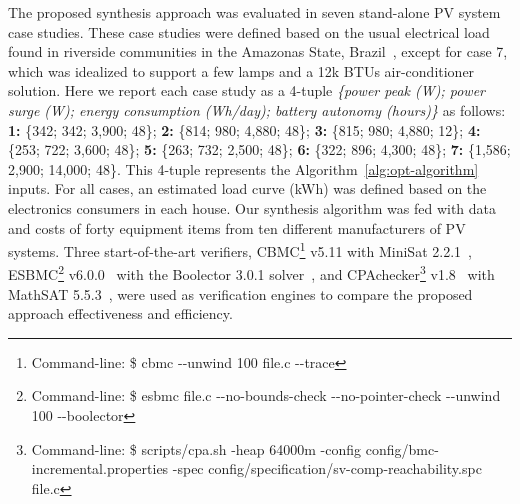 \documentclass[runningheads]{llncs}
\begin{document}
The proposed synthesis approach was evaluated in seven stand-alone PV system case studies.
These case studies were defined based on the usual electrical load found in riverside communities in the Amazonas State, Brazil~\cite{TrindadeCordeiro19,Agrener2013}, except for case 7, which was idealized to support a few lamps and a 12k BTUs air-conditioner solution. 
Here we report each case study as a 4-tuple \textit{\{power peak (W); power surge (W); energy consumption (Wh/day); battery autonomy (hours)\}} as follows:
\textbf{1:} \{342; 342; 3,900; 48\}; \textbf{2:} \{814; 980; 4,880; 48\}; \textbf{3:} \{815; 980; 4,880; 12\}; \textbf{4:} \{253; 722; 3,600; 48\}; \textbf{5:} \{263; 732; 2,500; 48\}; \textbf{6:} \{322; 896; 4,300; 48\}; \textbf{7:} \{1,586; 2,900; 14,000; 48\}. This 4-tuple represents the Algorithm~\ref{alg:opt-algorithm} inputs. For all cases, an estimated load curve (kWh) was defined based on the electronics consumers in each house. Our synthesis algorithm was fed with data and costs of forty equipment items from ten different manufacturers of PV systems. 
%
Three start-of-the-art verifiers, CBMC\footnote{Command-line: \$ cbmc -\phantom{}-unwind 100 file.c -\phantom{}-trace} v5.11 with MiniSat 2.2.1~\cite{Kroening}, ESBMC\footnote{Command-line: \$ esbmc file.c -\phantom{}-no-bounds-check -\phantom{}-no-pointer-check -\phantom{}-unwind 100 -\phantom{}-boolector} v6.0.0~\cite{esbmc2018} with the Boolector 3.0.1 solver~\cite{Brummayer}, and CPAchecker\footnote{Command-line: \$ scripts/cpa.sh -heap 64000m -config config/bmc-incremental.properties -spec config/specification/sv-comp-reachability.spc file.c} v1.8~\cite{Beyer2011} with MathSAT 5.5.3~\cite{mathsat5}, were used as verification engines to compare the proposed approach effectiveness and efficiency. 

\end{document}
